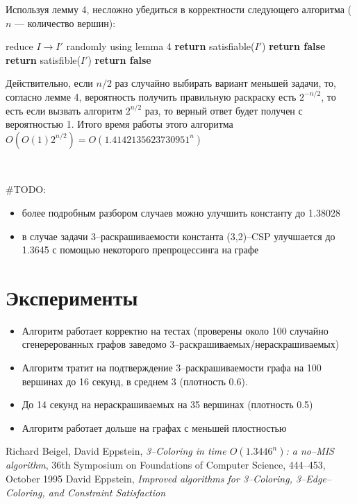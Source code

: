 \documentclass[fleqn]{article}
\theoremstyle{plain}
\theoremstyle{plain}
\theoremstyle{plain}
\theoremstyle{definition}
\begin{document}
Используя лемму 4, несложно убедиться в корректности следующего алгоритма ($n$ --- количество вершин):
\begin{algorithm}[H]
  \begin{algorithmic}[1]
				\State reduce $I \rightarrow I'$ randomly using lemma 4
				\State \textbf{return} satisfiable($I'$)
				\State \textbf{return false}
			\Else
				\State \textbf{return} satisfible($I'$)
			\EndIf
    	\EndFor
    	\State \textbf{return false}
    \EndFunction
  \end{algorithmic}
\end{algorithm}

Действительно, если $n/2$ раз случайно выбирать вариант меньшей задачи, то, согласно лемме 4, вероятность получить правильную раскраску есть $2^{-n/2}$, то есть если вызвать алгоритм $2^{n/2}$ раз, то верный ответ будет получен с вероятностью 1. Итого время работы этого алгоритма $O(O(1)2^{n/2}) = O(1.4142135623730951^n)$


\

\#TODO: 
\begin{itemize}
	\item более подробным разбором случаев можно улучшить константу до 1.38028
	\item в случае задачи 3--раскрашиваемости константа (3,2)--CSP улучшается до 1.3645 с помощью некоторого препроцессинга на графе
\end{itemize} 

\section{Эксперименты}
\begin{itemize}
	\item Алгоритм работает корректно на тестах (проверены около 100 случайно сгенерерованных графов заведомо 3--раскрашиваемых/нераскрашиваемых)
	\item Алгоритм тратит на подтверждение 3--раскрашиваемости графа на 100 вершинах до 16 секунд, в среднем 3 (плотность 0.6).
	\item До 14 секунд на нераскрашиваемых на 35 вершинах (плотность 0.5)
	\item Алгоритм работает дольше на графах с меньшей плостностью
\end{itemize}
\begin{thebibliography}{}
     Richard Beigel, David Eppstein, \emph{3--Coloring in time $O(1.3446^n)$: a no--MIS algorithm}, 36th Symposium on Foundations of Computer Science, 444--453, October 1995
     David Eppstein, \emph{Improved algorithms for 3--Coloring, 3--Edge--Coloring, and Constraint Satisfaction} 
\end{thebibliography}
\end{document}
